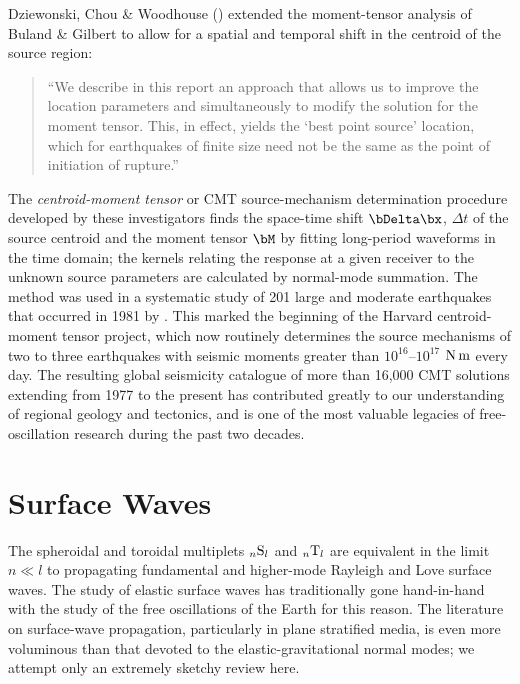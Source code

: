 Dziewonski, Chou \& Woodhouse (\citeyear{dziewonski&al81})
extended the moment-tensor analysis of Buland \& Gilbert to allow for
a spatial and temporal shift in the centroid of the
source region:
\begin{quote}
``We describe in this report an approach that allows us to improve
the location parameters and simultaneously to modify the solution
for the moment tensor.  This, in effect, yields the `best point source'
location, which for earthquakes of finite size need not be the same as
the point of initiation of rupture.''
\end{quote}
The {\em centroid-moment tensor\/}
%
or CMT source-mechanism
%
determination procedure
developed by these investigators 
finds the space-time shift $\bDelta\bx$,
$\Delta t$ of the source centroid
and the moment tensor $\bM$ by fitting
long-period waveforms in the time domain; the kernels
relating the response at a given receiver to the
unknown source parameters are calculated by normal-mode summation.
The method was used in a systematic
study of 201 large and moderate earthquakes that occurred
in 1981 by \textcite{dziewonski&woodhouse83}.  This marked the
beginning of the Harvard centroid-moment tensor project,
which now routinely determines the source mechanisms
of two to three earthquakes with seismic moments greater
than $10^{16}$--$10^{17}$ ${\rm N}\,{\rm m}$ every day.
The resulting global seismicity catalogue
of more than 16,000 CMT solutions
extending from 1977 to the
present has contributed greatly
to our understanding of regional geology and tectonics,
and is one of the most valuable legacies of free-oscillation
research during the past two decades.

\section{Surface Waves}
%

The spheroidal and toroidal multiplets ${}_n{\rm S}_l$ and
${}_n{\rm T}_l$ are equivalent in the limit $n\ll l$ to
propagating fundamental and higher-mode Rayleigh and Love
surface waves.  The study of elastic surface waves has
traditionally gone hand-in-hand with the study of the
free oscillations of the Earth for this reason.
The literature on surface-wave propagation, particularly in plane
stratified media, is even more voluminous than that
devoted to the elastic-gravitational normal modes;
we attempt only an extremely sketchy review here.

